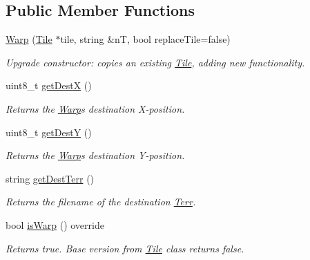 \subsection*{Public Member Functions}
\begin{DoxyCompactItemize}
\item 
\hyperlink{class_warp_ab3dc6510e257e6ce5f621c7201430c62}{Warp} (\hyperlink{class_tile}{Tile} $\ast$tile, string \&nT, bool replace\+Tile=false)\hypertarget{class_warp_ab3dc6510e257e6ce5f621c7201430c62}{}\label{class_warp_ab3dc6510e257e6ce5f621c7201430c62}

\begin{DoxyCompactList}\small\item\em Upgrade constructor\+: copies an existing \hyperlink{class_tile}{Tile}, adding new functionality. \end{DoxyCompactList}\item 
uint8\+\_\+t \hyperlink{class_warp_a9d4c56d3be35a5c8b928b3b8acf5006f}{get\+DestX} ()\hypertarget{class_warp_a9d4c56d3be35a5c8b928b3b8acf5006f}{}\label{class_warp_a9d4c56d3be35a5c8b928b3b8acf5006f}

\begin{DoxyCompactList}\small\item\em Returns the \hyperlink{class_warp}{Warp}\textquotesingle{}s destination X-\/position. \end{DoxyCompactList}\item 
uint8\+\_\+t \hyperlink{class_warp_a490f1fee6c3ecd8243847ae63ffa9dbb}{get\+DestY} ()\hypertarget{class_warp_a490f1fee6c3ecd8243847ae63ffa9dbb}{}\label{class_warp_a490f1fee6c3ecd8243847ae63ffa9dbb}

\begin{DoxyCompactList}\small\item\em Returns the \hyperlink{class_warp}{Warp}\textquotesingle{}s destination Y-\/position. \end{DoxyCompactList}\item 
string \hyperlink{class_warp_a5c61204c5eafbd5dfa8a365c08257eec}{get\+Dest\+Terr} ()\hypertarget{class_warp_a5c61204c5eafbd5dfa8a365c08257eec}{}\label{class_warp_a5c61204c5eafbd5dfa8a365c08257eec}

\begin{DoxyCompactList}\small\item\em Returns the filename of the destination \hyperlink{class_terr}{Terr}. \end{DoxyCompactList}\item 
bool \hyperlink{class_warp_ad747a08d0092f0b7362743b415795054}{is\+Warp} () override\hypertarget{class_warp_ad747a08d0092f0b7362743b415795054}{}\label{class_warp_ad747a08d0092f0b7362743b415795054}

\begin{DoxyCompactList}\small\item\em Returns true. Base version from \hyperlink{class_tile}{Tile} class returns false. \end{DoxyCompactList}\end{DoxyCompactItemize}
